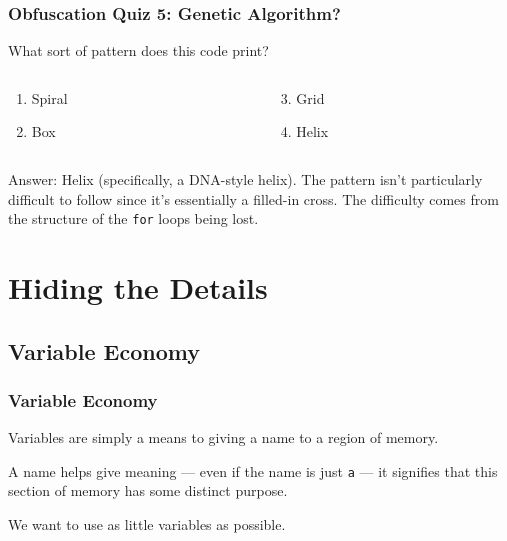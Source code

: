 \documentclass[handout,xcolor]{beamer}
\begin{document}
\begin{frame}
	\frametitle{Obfuscation Quiz 5: Genetic Algorithm?}
	\pause
	
	What sort of pattern does this code print?
	
	
	\pause
	
	\begin{columns}
		\begin{column}{0.45\textwidth}
			\begin{enumerate}
				\item Spiral
				\pause
				\item Box
			\end{enumerate}
		\end{column}
		\pause
		\begin{column}{0.45\textwidth}
			\begin{enumerate}
				\setcounter{enumi}{2}
				\item Grid
				\pause
				\item Helix
			\end{enumerate}
		\end{column}
	\end{columns}
	\pause
	
	\vspace{0.5cm}
	
	Answer: Helix (specifically, a DNA-style helix). \pause The pattern isn't particularly difficult to follow since it's essentially a filled-in cross. \pause The difficulty comes from the structure of the \texttt{for} loops being lost.
\end{frame}

\section{Hiding the Details}

\subsection{Variable Economy}

\begin{frame}
	\frametitle{Variable Economy}
	\pause
	
	Variables are simply a means to giving a name to a region of memory.
	\pause
	
	A name helps give meaning --- even if the name is just \texttt{a} --- it signifies that this section of memory has some distinct purpose.
	\pause
	
	We want to use as little variables as possible.
	\pause
	
	
\end{frame}
\end{document}
